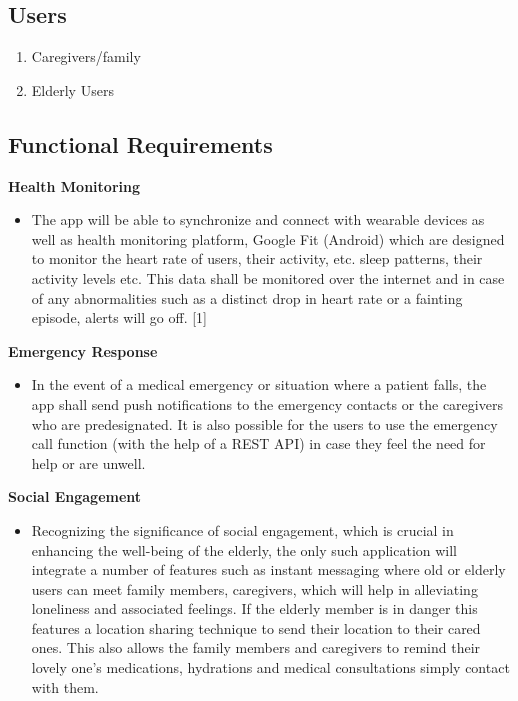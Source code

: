 \documentclass[a4paper, 12pt]{article} %
\begin{document}
\subsection{Users}
\begin{enumerate}
    \item Caregivers/family
    \item Elderly Users
\end{enumerate}

\subsection{Functional Requirements}
\textbf{Health Monitoring }
\begin{itemize}
    \item The app will be able to synchronize and connect with wearable devices as well as health monitoring platform, Google Fit (Android) which are designed to monitor the heart rate of users, their activity, etc. sleep patterns, their activity levels etc. This data shall be monitored over the internet and in case of any abnormalities such as a distinct drop in heart rate or a fainting episode, alerts will go off. [1]
\end{itemize}
\textbf{Emergency Response}
\begin{itemize}
    \item In the event of a medical emergency or situation where a patient falls, the app shall send push notifications to the emergency contacts or the caregivers who are predesignated. It is also possible for the users to use the emergency call function (with the help of a REST API) in case they feel the need for help or are unwell.
\end{itemize}
\textbf{Social Engagement }
\begin{itemize}
    \item Recognizing the significance of social engagement, which is crucial in enhancing the well-being of the elderly, the only such application will integrate a number of features such as instant messaging where old or elderly users can meet family members, caregivers, which will help in alleviating loneliness and associated feelings. If the elderly member is in danger this features a location sharing technique to send their location to their cared ones. This also allows the family members and caregivers to remind their lovely one’s medications, hydrations and medical consultations simply contact with them.
\end{itemize}
\end{document}
